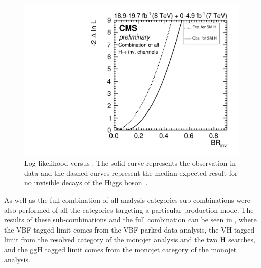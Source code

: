 \begin{figure}
  \includegraphics[width=\largefigwidth]{plots/comb/HIG-15-012-figs/combscan.pdf}
  \caption{Log-likelihood versus \BRinv. The solid curve represents the observation in data and the dashed curves represent the median expected result for no invisible decays of the Higgs boson~\cite{CMS-PAS-HIG-15-012}.}
  \label{fig:parkedcombscan}
\end{figure}

As well as the full combination of all analysis categories sub-combinations were also performed of all the categories targeting a particular production mode. The results of these sub-combinations and the full combination can be seen in , where the \ac{VBF}-tagged limit comes from the \ac{VBF} parked data analysis, the \ac{VH}-tagged limit from the resolved category of the monojet analysis and the two \PZ$\rm{H}$ searches, and the \ac{ggH} tagged limit comes from the monojet category of the monojet analysis.

